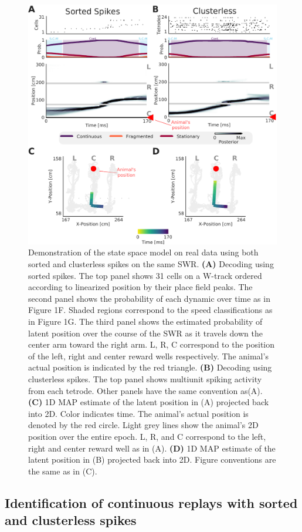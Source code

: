 \documentclass[times, twoside]{zHenriquesLab-StyleBioRxiv}
\begin{document}
\begin{figure}%
\centering
\includegraphics[width=0.80\linewidth]{figures/Figure2/Figure2_v4}
\caption{Demonstration of the state space model on real data using both sorted and clusterless spikes on the same SWR. \textbf{(A)} Decoding using sorted spikes. The top panel shows 31 cells on a W-track ordered according to linearized position by their place field peaks. The second panel shows the probability of each dynamic over time as in Figure 1F. Shaded regions correspond to the speed classifications as in Figure 1G. The third panel shows the estimated probability of latent position over the course of the SWR as it travels down the center arm toward the right arm. L, R, C correspond to the position of the left, right and center reward wells respectively. The animal's actual position is indicated by the red triangle. \textbf{(B)} Decoding using clusterless spikes. The top panel shows multiunit spiking activity from each tetrode. Other panels have the same convention as(A).  \textbf{(C)} 1D MAP estimate of the latent position in (A) projected back into 2D. Color indicates time. The animal's actual position is denoted by the red circle. Light grey lines show the animal's 2D position over the entire epoch. L, R, and C correspond to the left, right and center reward well as in (A). \textbf{(D)} 1D MAP estimate of the latent position in (B) projected back into 2D. Figure conventions are the same as in (C).
}
\label{2}
\end{figure}
\subsection*{Identification of continuous replays with sorted and clusterless spikes}
\end{document}
